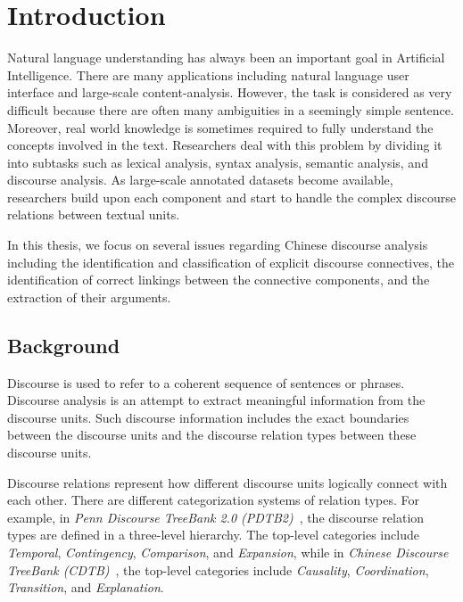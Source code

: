 %
%
%
\chapter{Introduction}
\label{c:intro}

Natural language understanding has always been an important goal in Artificial
Intelligence. There are many applications including natural language user
interface and large-scale content-analysis. However, the task is considered
as very difficult because there are often many ambiguities in a seemingly
simple sentence. Moreover, real world knowledge is sometimes required to fully
understand the concepts involved in the text. Researchers deal with this problem
by dividing it into subtasks such as lexical analysis, syntax analysis, semantic
analysis, and discourse analysis. As large-scale annotated datasets become
available, researchers build upon each component and start to handle the
complex discourse relations between textual units.

In this thesis, we focus on several issues regarding Chinese discourse analysis
including the identification and classification of explicit discourse connectives,
the identification of correct linkings between the connective components,
and the extraction of their arguments. 

%
%
\section{Background}

Discourse is used to refer to a coherent sequence of sentences or phrases.
Discourse analysis is an attempt to extract meaningful information from
the discourse units. Such discourse information includes the exact boundaries
between the discourse units and the discourse relation types between
these discourse units.

Discourse relations represent how different discourse units logically connect
with each other. There are different categorization systems of relation types.
For example, in
\textit{Penn Discourse TreeBank 2.0 (PDTB2)}~\citep{Prasad08thepenn}, the discourse
relation types are defined in a three-level hierarchy. The top-level categories
include \textit{Temporal}, \textit{Contingency}, \textit{Comparison},
and \textit{Expansion}, while in
\textit{Chinese Discourse TreeBank (CDTB)}~\citep{li2014building}, 
the top-level categories include \textit{Causality}, \textit{Coordination},
\textit{Transition}, and \textit{Explanation}.

